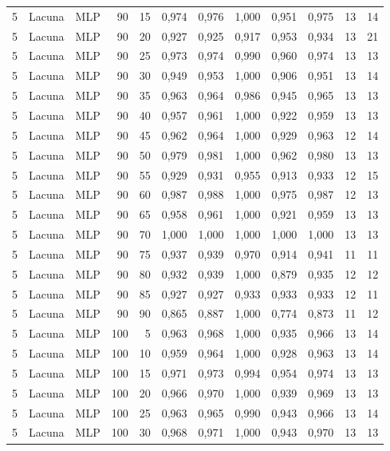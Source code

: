 \begin{longtable}{@{}rllrrrrrrrrr@{}}
5 & Lacuna & MLP & 90 & 15 & 0,974 & 0,976 & 1,000 & 0,951 & 0,975 & 13 & 14 \\
5 & Lacuna & MLP & 90 & 20 & 0,927 & 0,925 & 0,917 & 0,953 & 0,934 & 13 & 21 \\
5 & Lacuna & MLP & 90 & 25 & 0,973 & 0,974 & 0,990 & 0,960 & 0,974 & 13 & 13 \\
5 & Lacuna & MLP & 90 & 30 & 0,949 & 0,953 & 1,000 & 0,906 & 0,951 & 13 & 14 \\
5 & Lacuna & MLP & 90 & 35 & 0,963 & 0,964 & 0,986 & 0,945 & 0,965 & 13 & 13 \\
5 & Lacuna & MLP & 90 & 40 & 0,957 & 0,961 & 1,000 & 0,922 & 0,959 & 13 & 13 \\
5 & Lacuna & MLP & 90 & 45 & 0,962 & 0,964 & 1,000 & 0,929 & 0,963 & 12 & 14 \\
5 & Lacuna & MLP & 90 & 50 & 0,979 & 0,981 & 1,000 & 0,962 & 0,980 & 13 & 13 \\
5 & Lacuna & MLP & 90 & 55 & 0,929 & 0,931 & 0,955 & 0,913 & 0,933 & 12 & 15 \\
5 & Lacuna & MLP & 90 & 60 & 0,987 & 0,988 & 1,000 & 0,975 & 0,987 & 12 & 13 \\
5 & Lacuna & MLP & 90 & 65 & 0,958 & 0,961 & 1,000 & 0,921 & 0,959 & 13 & 13 \\
5 & Lacuna & MLP & 90 & 70 & 1,000 & 1,000 & 1,000 & 1,000 & 1,000 & 13 & 13 \\
5 & Lacuna & MLP & 90 & 75 & 0,937 & 0,939 & 0,970 & 0,914 & 0,941 & 11 & 11 \\
5 & Lacuna & MLP & 90 & 80 & 0,932 & 0,939 & 1,000 & 0,879 & 0,935 & 12 & 12 \\
5 & Lacuna & MLP & 90 & 85 & 0,927 & 0,927 & 0,933 & 0,933 & 0,933 & 12 & 11 \\
5 & Lacuna & MLP & 90 & 90 & 0,865 & 0,887 & 1,000 & 0,774 & 0,873 & 11 & 12 \\
5 & Lacuna & MLP & 100 & 5 & 0,963 & 0,968 & 1,000 & 0,935 & 0,966 & 13 & 14 \\
5 & Lacuna & MLP & 100 & 10 & 0,959 & 0,964 & 1,000 & 0,928 & 0,963 & 13 & 14 \\
5 & Lacuna & MLP & 100 & 15 & 0,971 & 0,973 & 0,994 & 0,954 & 0,974 & 13 & 13 \\
5 & Lacuna & MLP & 100 & 20 & 0,966 & 0,970 & 1,000 & 0,939 & 0,969 & 13 & 13 \\
5 & Lacuna & MLP & 100 & 25 & 0,963 & 0,965 & 0,990 & 0,943 & 0,966 & 13 & 14 \\
5 & Lacuna & MLP & 100 & 30 & 0,968 & 0,971 & 1,000 & 0,943 & 0,970 & 13 & 13 \\

\end{longtable}
